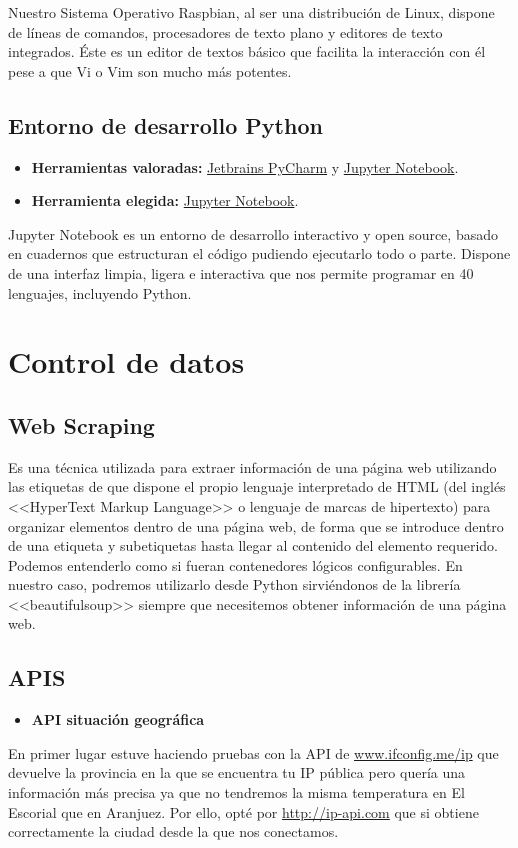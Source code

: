 Nuestro Sistema Operativo Raspbian\cite{misc:RbPWeb}, al ser una distribución de Linux\cite{misc:Linux}, dispone de líneas de comandos, procesadores de texto plano y editores de texto integrados. Éste es un editor de textos básico que facilita la interacción con él pese a que Vi o Vim son mucho más potentes.

\subsection{Entorno de desarrollo Python}
\begin{itemize}
    \item \textbf{Herramientas valoradas:} \href{https://www.jetbrains.com/es-es/pycharm/}{Jetbrains PyCharm} y \href{https://jupyter.org/}{Jupyter Notebook}.
    \item \textbf{Herramienta elegida:} \href{https://jupyter.org/}{Jupyter Notebook}.
\end{itemize}

Jupyter Notebook es un entorno de desarrollo interactivo y open source, basado en cuadernos que estructuran el código pudiendo ejecutarlo todo o parte. Dispone de una interfaz limpia, ligera e interactiva que nos permite programar en 40 lenguajes, incluyendo Python\cite{misc:Python}.

\section{Control de datos}
\subsection{Web Scraping}
Es una técnica utilizada para extraer información de una página web utilizando las etiquetas de que dispone el propio lenguaje interpretado de HTML (del inglés <<HyperText Markup Language>> o lenguaje de marcas de hipertexto) para organizar elementos dentro de una página web, de forma que se introduce dentro de una etiqueta y subetiquetas hasta llegar al contenido del elemento requerido. Podemos entenderlo como si fueran contenedores lógicos configurables.
En nuestro caso, podremos utilizarlo desde Python\cite{misc:Python} sirviéndonos de la librería <<beautifulsoup>> siempre que necesitemos obtener información de una página web.

\subsection{APIS}
\begin{itemize}
    \item \textbf{API situación geográfica}
\end{itemize}
En primer lugar estuve haciendo pruebas con la API de \url{www.ifconfig.me/ip} que devuelve la provincia en la que se encuentra tu IP pública pero quería una información más precisa ya que no tendremos la misma temperatura en El Escorial que en Aranjuez. Por ello, opté por \url{http://ip-api.com} que si obtiene correctamente la ciudad desde la que nos conectamos.

